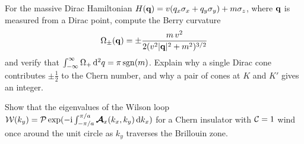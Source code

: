 \begin{exercise}
  For the massive Dirac Hamiltonian
  $H(\mathbf{q})=v(q_x\sigma_x+q_y\sigma_y)+m\sigma_z$, where $\mathbf{q}$ is
  measured from a Dirac point, compute the Berry curvature
  \begin{equation}
    \Omega_\pm(\mathbf{q}) = \pm\frac{m\,v^2}{2(v^2|\mathbf{q}|^2+m^2)^{3/2}}
  \end{equation}
  and verify that $\int_{-\infty}^{\infty}\Omega_+\,\mathrm{d}^2 q=\pi\operatorname{sgn}(m)$.
  Explain why a single Dirac cone contributes $\pm\frac{1}{2}$ to the
  Chern number, and why a pair of cones at $K$ and $K'$ gives an
  integer.
\end{exercise}

\begin{exercise}
  Show that the eigenvalues of the Wilson loop
  $\mathcal{W}(k_y)=\mathcal{P}\exp(-\mathrm{i}\int_{-\pi/a}^{\pi/a}
  \boldsymbol{\mathcal{A}}_x(k_x,k_y)\,\mathrm{d} k_x)$ for a Chern
  insulator with $\mathcal{C}=1$ wind once around the unit circle as $k_y$
  traverses the Brillouin zone.
\end{exercise}
